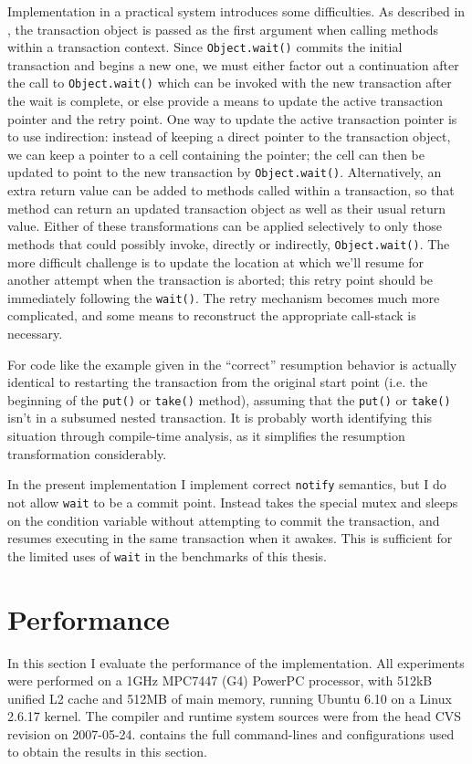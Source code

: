 Implementation in a practical system introduces some difficulties.  As
described in , the transaction object is passed as
the first argument when calling methods within a transaction context.
Since \texttt{Object.wait()} commits the initial transaction and
begins a new one, we must either factor out a continuation after the
call to \texttt{Object.wait()} which can be invoked with the new
transaction after the wait is complete, or else provide a means to
update the active transaction pointer and the retry point.  One way to
update the active transaction pointer is to use indirection: instead
of keeping a direct pointer to the transaction object, we can keep a
pointer to a cell containing the pointer; the cell can then be updated
to point to the new transaction by \texttt{Object.wait()}.
Alternatively, an extra return value can be added to methods called
within a transaction, so that method can return an updated transaction
object as well as their usual return value.  Either of these
transformations can be applied selectively to only those methods that
could possibly invoke, directly or indirectly, \texttt{Object.wait()}.
The more difficult challenge is to update the location at which we'll
resume for another attempt when the transaction is aborted; this retry
point should be immediately following the
\texttt{wait()}. The retry mechanism
becomes much more complicated, and some means to reconstruct the
appropriate call-stack is necessary.

For code like the example given in  the
``correct'' resumption behavior is actually identical to restarting
the transaction from the original start point (i.e. the beginning of
the \texttt{put()} or \texttt{take()} method), assuming that the
\texttt{put()} or \texttt{take()} isn't in a subsumed nested
transaction.  It is probably worth identifying this situation through
compile-time analysis, as it simplifies the resumption transformation
considerably.

In the present implementation I implement correct \texttt{notify} semantics,
but I do not allow \texttt{wait} to be a commit point.  Instead \flex
takes the special mutex and sleeps on the condition variable without
attempting to commit the transaction, and resumes executing in the same
transaction when it awakes.  This is sufficient for the limited uses of
\texttt{wait} in the benchmarks of this thesis.

\section{Performance}\label{sec:full-bench}
In this section I evaluate the performance of the \apex implementation.
All experiments were performed on a 1GHz MPC7447 (G4) PowerPC processor,
with 512kB unified L2 cache and 512MB of main memory, running Ubuntu
6.10 on a Linux 2.6.17 kernel.  The \flex compiler and runtime system
sources were from the head CVS revision on 2007-05-24.  
contains the full \flex command-lines and configurations used to obtain the
results in this section.

